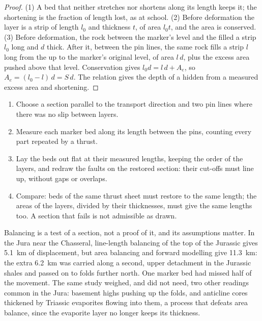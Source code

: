 \begin{proof}
(1) A bed that neither stretches nor shortens along its length keeps it; the shortening is
the fraction of length lost, as at school. (2) Before deformation the layer is a strip of
length $l_0$ and thickness $t$, of area $l_0 t$, and the area is conserved. (3) Before
deformation, the rock between the marker's level and the  filled a strip $l_0$
long and $d$ thick. After it, between the pin lines, the same rock fills a strip $l$ long
from the  up to the marker's original level, of area $l\,d$, plus the excess
area pushed above that level. Conservation gives $l_0 d = l\,d + A_e$, so $A_e = (l_0 -
l)\,d = S\,d$. The relation gives the depth of a hidden  from a measured excess
area and shortening.
\end{proof}


\begin{method}\label{met:b2:alpine-orogen:restore}
\begin{enumerate}
\item Choose a section parallel to the transport direction and two pin lines where there
was no slip between layers.
\item Measure each marker bed along its length between the pins, counting every part
repeated by a thrust.
\item Lay the beds out flat at their measured lengths, keeping the order of the layers,
and redraw the faults on the restored section: their cut-offs must line up, without gaps
or overlaps.
\item Compare: beds of the same thrust sheet must restore to the same length; the areas of
the layers, divided by their thicknesses, must give the same lengths too. A section that
fails is not admissible as drawn.
\end{enumerate}
\end{method}

Balancing is a test of a section, not a proof of it, and its assumptions matter. In the Jura
near the Chasseral, line-length balancing of the top of the Jurassic gives \qty{5.1}{km} of
displacement, but area balancing and forward modelling give \qty{11.3}{km}: the extra
\qty{6.2}{km} was carried along a second, upper detachment in the Jurassic shales and passed
on to folds further north. One marker bed had missed half of the movement. The same study
weighed, and did not need, two other readings common in the Jura: basement highs pushing
up the folds, and anticline cores thickened by Triassic evaporites flowing into them, a
process that defeats area balance, since the evaporite layer no longer keeps its
thickness.

